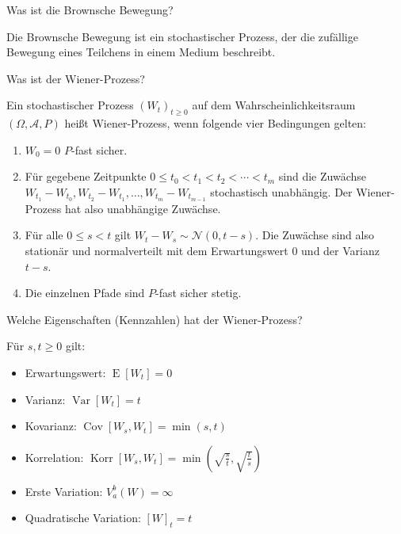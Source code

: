 \begin{QandA}
    \item Was ist die Brownsche Bewegung?
    \begin{answered}
        Die Brownsche Bewegung ist ein stochastischer Prozess, der die zufällige Bewegung eines Teilchens in einem Medium beschreibt.
    \end{answered}

    \item Was ist der Wiener-Prozess?
    \begin{answered}
        Ein stochastischer Prozess $(W_{t})_{t \geq 0}$ auf dem Wahrscheinlichkeitsraum $(\Omega ,{\mathcal{A}},P)$ heißt Wiener-Prozess, wenn folgende vier Bedingungen gelten:
        \begin{enumerate}
            \item $W_{0}=0$ $P$-fast sicher.
            \item Für gegebene Zeitpunkte $0\leq t_{0}<t_{1}<t_{2}<\dotsb <t_{m}$ sind die Zuwächse $W_{t_{1}}-W_{t_{0}},W_{t_{2}}-W_{t_{1}},\dotsc ,W_{t_{m}}-W_{t_{m-1}}$ stochastisch unabhängig.
                  Der Wiener-Prozess hat also unabhängige Zuwächse.
            \item Für alle $0\leq s<t$ gilt $W_{t}-W_{s} \sim{\mathcal{N}}\left(0,t-s\right)$.
                  Die Zuwächse sind also stationär und normalverteilt mit dem Erwartungswert $0$ und der Varianz $t-s$.
            \item Die einzelnen Pfade sind $P$-fast sicher stetig.
        \end{enumerate}
    \end{answered}

    \item Welche Eigenschaften (Kennzahlen) hat der Wiener-Prozess?
    \begin{answered}
        Für $s, t \geq 0$ gilt:
        \begin{itemize}
            \item Erwartungswert: $\operatorname{E}[W_t] = 0$
            \item Varianz: $\operatorname{Var}[W_t] = t$
            \item Kovarianz: $\operatorname{Cov}[W_s, W_t] = \min(s, t)$
            \item Korrelation: $\operatorname{Korr}[W_s, W_t] = \min(\sqrt{\frac{s}{t}}, \sqrt{\frac{t}{s}})$
            \item Erste Variation: $V_a^b(W) = \infty$
            \item Quadratische Variation: $[W]_t = t$
        \end{itemize}
    \end{answered}


\end{QandA}
